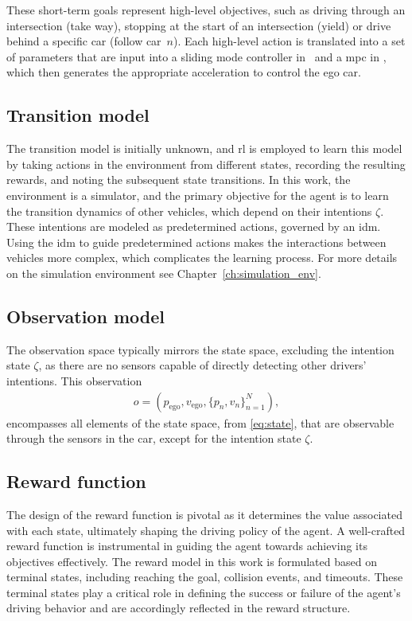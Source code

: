 These short-term goals represent high-level objectives, such as driving through an intersection (take way), stopping at the start of an intersection (yield) or drive behind a specific car (follow car~$n$). Each high-level action is translated into a set of parameters that are input into a sliding mode controller in \paperLSTM \ and a \gls{mpc} in \paperMPC, which then generates the appropriate acceleration to control the ego car.

\subsection{Transition model}
The transition model is initially unknown, and \gls{rl} is employed to learn this model by taking actions in the environment from different states, recording the resulting rewards, and noting the subsequent state transitions. In this work, the environment is a simulator, and the primary objective for the agent is to learn the transition dynamics of other vehicles, which depend on their intentions $\zeta$. These intentions are modeled as predetermined actions, governed by an \gls{idm}. Using the \gls{idm} to guide predetermined actions makes the interactions between vehicles more complex, which complicates the learning process. For more details on the simulation environment see Chapter~\ref{ch:simulation_env}.


\subsection{Observation model}
The observation space typically mirrors the state space, excluding the intention state $\zeta$, as there are no sensors capable of directly detecting other drivers' intentions. This observation 
\begin{align}
	o = (p_\mathrm{ego}, v_\mathrm{ego}, \{p_{n}, v_n\}_{n=1}^N), 
	\label{eq:observation}
\end{align}
encompasses all elements of the state space, from \eqref{eq:state}, that are observable through the sensors in the car, except for the intention state $\zeta$.

\subsection{Reward function}
The design of the reward function is pivotal as it determines the value associated with each state, ultimately shaping the driving policy of the agent. A well-crafted reward function is instrumental in guiding the agent towards achieving its objectives effectively.
The reward model in this work is formulated based on terminal states, including reaching the goal, collision events, and timeouts. These terminal states play a critical role in defining the success or failure of the agent's driving behavior and are accordingly reflected in the reward structure.

